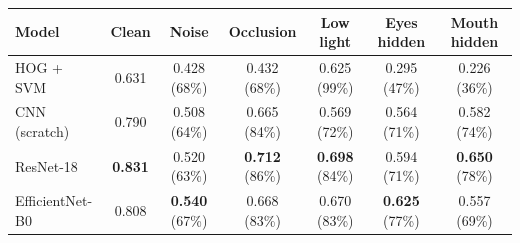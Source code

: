 \begin{tabular}{lcccccc}
\toprule
Model & Clean & Noise & Occlusion & Low light & Eyes hidden & Mouth hidden \\
\midrule
HOG + SVM & 0.631 & 0.428 (68\%) & 0.432 (68\%) & 0.625 (99\%) & 0.295 (47\%) & 0.226 (36\%) \\
CNN (scratch) & 0.790 & 0.508 (64\%) & 0.665 (84\%) & 0.569 (72\%) & 0.564 (71\%) & 0.582 (74\%) \\
ResNet-18 & \textbf{0.831} & 0.520 (63\%) & \textbf{0.712} (86\%) & \textbf{0.698} (84\%) & 0.594 (71\%) & \textbf{0.650} (78\%) \\
EfficientNet-B0 & 0.808 & \textbf{0.540} (67\%) & 0.668 (83\%) & 0.670 (83\%) & \textbf{0.625} (77\%) & 0.557 (69\%) \\
\bottomrule
\end{tabular}
